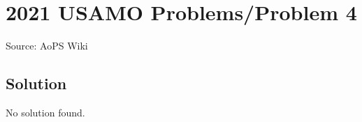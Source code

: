 \documentclass[12pt]{article}
\begin{document}
\section*{{2021 USAMO Problems/Problem 4}}
Source: AoPS Wiki

\subsection*{Solution}
No solution found.
\end{document}
